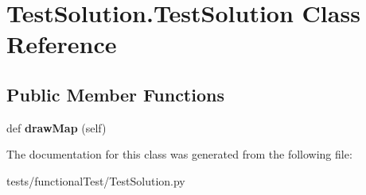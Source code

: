 \hypertarget{class_test_solution_1_1_test_solution}{}\section{Test\+Solution.\+Test\+Solution Class Reference}
\label{class_test_solution_1_1_test_solution}
\subsection*{Public Member Functions}
\begin{DoxyCompactItemize}
\item 
\mbox{\label{class_test_solution_1_1_test_solution_a6d1b573caf6cf311edc262c7bb4a1577}} 
def {\bfseries draw\+Map} (self)
\end{DoxyCompactItemize}


The documentation for this class was generated from the following file\+:\begin{DoxyCompactItemize}
\item 
tests/functional\+Test/Test\+Solution.\+py\end{DoxyCompactItemize}

